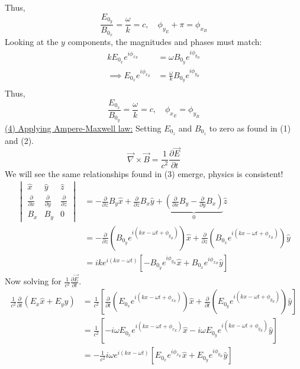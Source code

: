 \documentclass[12pt]{article}
\begin{document}
Thus,
\[\boxed{\frac{E_{0_y}}{B_{0_x}} = \frac{\omega}{k} = c, \quad \phi_{y_E} + \pi= \phi_{x_B}}\]
Looking at the $y$ components, the magnitudes and phases must match:
\[\begin{aligned}
    kE_{0_x}e^{i\phi_{x_E}} &= \omega B_{0_y} e^{i\phi_{y_B}} \\
    \implies E_{0_x}e^{i\phi_{x_E}} &= \frac{\omega}{k} B_{0_y} e^{i\phi_{y_B}} \\
\end{aligned}\]
Thus,
\[\boxed{\frac{E_{0_x}}{B_{0_y}} = \frac{\omega}{k} = c, \quad \phi_{x_E} = \phi_{y_B}}\]
\underline{(4) Applying Ampere-Maxwell law:} Setting $E_{0_z}$ and $B_{0_z}$ to zero as found in (1) and (2).
\[\vec{\nabla} \times \vec{B} = \frac{1}{c^2} \frac{\partial \vec{E}}{\partial t}\]
We will see the same relationships found in (3) emerge, physics is consistent!
\[\begin{aligned}
\begin{vmatrix} 
\hat{x} & \hat{y} & \hat{z} \\ 
\frac{\partial}{\partial x} & \frac{\partial}{\partial y} & \frac{\partial}{\partial z} \\ 
B_x & B_y & 0 
\end{vmatrix} &= -\frac{\partial}{\partial z} B_y \hat{x} + \frac{\partial}{\partial z} B_x \hat{y} + \underbrace{\left( \frac{\partial}{\partial x} B_y - \frac{\partial}{\partial y} B_x \right)}_{0} \hat{z}\\
&= -\frac{\partial}{\partial z} \left( B_{0_y} e^{i(kx - \omega t + \phi_{y_B})} \right) \hat{x} + \frac{\partial}{\partial z} \left( B_{0_x} e^{i(kx - \omega t + \phi_{x_B})} \right) \hat{y}\\
&= i k e^{i(kx - \omega t)} \left[ -B_{0_y} e^{i \phi_{y_B}} \hat{x} + B_{0_x} e^{i \phi_{x_B}} \hat{y} \right]
\end{aligned}\]
Now solving for $\frac{1}{c^2} \frac{\partial \vec{E}}{\partial t}$. 
\[\begin{aligned}
\frac{1}{c^2} \frac{\partial}{\partial t} (E_x \hat{x} + E_y \hat{y}) &= \frac{1}{c^2} \left[ \frac{\partial}{\partial t} (E_{0_x} e^{i(kx - \omega t + \phi_{x_E})}) \hat{x} + \frac{\partial}{\partial t} (E_{0_y} e^{i(kx - \omega t + \phi_{y_E})}) \hat{y} \right] \\
&= \frac{1}{c^2} \left[ -i \omega E_{0_x} e^{i(kx - \omega t + \phi_{x_E})} \hat{x} - i \omega E_{0_y} e^{i(kx - \omega t + \phi_{y_E})} \hat{y} \right] \\
&= -\frac{1}{c^2} i \omega e^{i(kx - \omega t)} \left[ E_{0_x} e^{i \phi_{x_E}} \hat{x} + E_{0_y} e^{i \phi_{y_E}} \hat{y} \right]
\end{aligned}\]
\end{document}

